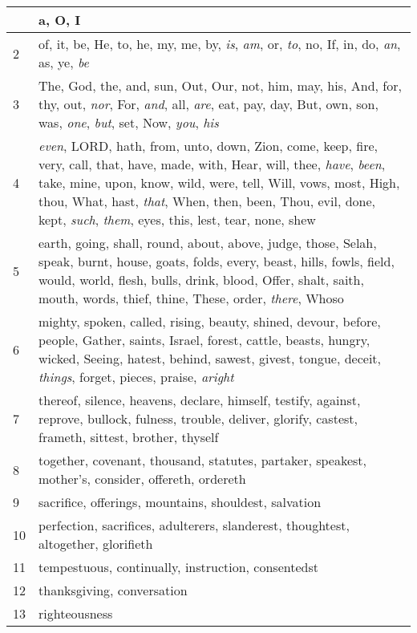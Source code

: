 \begin{longtable}{l|p{3.75in}}
\hline \hline
\endlastfoot
1 & a, O, I \\ \hline
2 & of, it, be, He, to, he, my, me, by, \emph{is}, \emph{am}, or, \emph{to}, no, If, in, do, \emph{an}, as, ye, \emph{be} \\ \hline
3 & The, God, the, and, sun, Out, Our, not, him, may, his, And, for, thy, out, \emph{nor}, For, \emph{and}, all, \emph{are}, eat, pay, day, But, own, son, was, \emph{one}, \emph{but}, set, Now, \emph{you}, \emph{his} \\ \hline
4 & \emph{even}, LORD, hath, from, unto, down, Zion, come, keep, fire, very, call, that, have, made, with, Hear, will, thee, \emph{have}, \emph{been}, take, mine, upon, know, wild, were, tell, Will, vows, most, High, thou, What, hast, \emph{that}, When, then, been, Thou, evil, done, kept, \emph{such}, \emph{them}, eyes, this, lest, tear, none, shew \\ \hline
5 & earth, going, shall, round, about, above, judge, those, Selah, speak, burnt, house, goats, folds, every, beast, hills, fowls, field, would, world, flesh, bulls, drink, blood, Offer, shalt, saith, mouth, words, thief, thine, These, order, \emph{there}, Whoso \\ \hline
6 & mighty, spoken, called, rising, beauty, shined, devour, before, people, Gather, saints, Israel, forest, cattle, beasts, hungry, wicked, Seeing, hatest, behind, sawest, givest, tongue, deceit, \emph{things}, forget, pieces, praise, \emph{aright} \\ \hline
7 & thereof, silence, heavens, declare, himself, testify, against, reprove, bullock, fulness, trouble, deliver, glorify, castest, frameth, sittest, brother, thyself \\ \hline
8 & together, covenant, thousand, statutes, partaker, speakest, mother's, consider, offereth, ordereth \\ \hline
9 & sacrifice, offerings, mountains, shouldest, salvation \\ \hline
10 & perfection, sacrifices, adulterers, slanderest, thoughtest, altogether, glorifieth \\ \hline
11 & tempestuous, continually, instruction, consentedst \\ \hline
12 & thanksgiving, conversation \\ \hline
13 & righteousness \\ \hline
\end{longtable}






 



